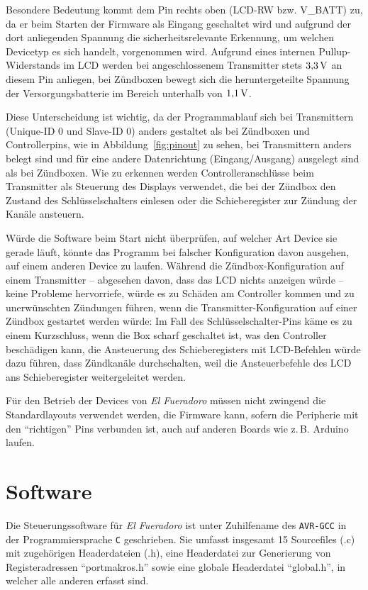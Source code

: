 \documentclass[pdftex, parskip, numbers=noenddot, toc=listof]{scrbook}
\newcommand{\anlage}{\emph{El Fueradoro}}
\begin{document}
	Besondere Bedeutung kommt dem Pin rechts oben (LCD-RW bzw. V\_BATT) zu, da er beim Starten der Firmware als Eingang geschaltet wird und aufgrund der dort anliegenden Spannung die sicherheitsrelevante Erkennung, um welchen Devicetyp es sich handelt, vorgenommen wird. Aufgrund eines internen Pullup-Widerstands im LCD werden bei angeschlossenem Transmitter stets $\unit[3{,}3]{V}$ an diesem Pin anliegen, bei Zündboxen bewegt sich die heruntergeteilte Spannung der Versorgungsbatterie im Bereich unterhalb von $\unit[1{,}1]{V}$.

	Diese Unterscheidung ist wichtig, da der Programmablauf sich bei Transmittern (Unique-ID 0 und Slave-ID 0) anders gestaltet als bei Zündboxen und Controllerpins, wie in Abbildung~\ref{fig:pinout} zu sehen, bei Transmittern anders belegt sind und für eine andere Datenrichtung (Eingang/Ausgang) ausgelegt sind als bei Zündboxen.  Wie zu erkennen werden Controlleranschlüsse beim Transmitter als Steuerung des Displays verwendet, die bei der Zündbox den Zustand des Schlüsselschalters einlesen oder die Schieberegister zur Zündung der Kanäle ansteuern.

	Würde die Software beim Start nicht überprüfen, auf welcher Art Device sie gerade läuft, könnte das Programm bei falscher Konfiguration davon ausgehen, auf einem anderen Device zu laufen. Während die Zündbox-Konfiguration auf einem Transmitter -- abgesehen davon, dass das LCD nichts anzeigen würde -- keine Probleme hervorriefe, würde es zu Schäden am Controller kommen und zu unerwünschten Zündungen führen, wenn die Transmitter-Konfiguration auf einer Zündbox gestartet werden würde: Im Fall des Schlüsselschalter-Pins käme es  zu einem Kurzschluss, wenn die Box scharf geschaltet ist, was den Controller beschädigen kann, die Ansteuerung des Schieberegisters mit LCD-Befehlen würde dazu führen, dass Zündkanäle durchschalten, weil die Ansteuerbefehle des LCD ans Schieberegister weitergeleitet werden.

	Für den Betrieb der Devices von {\anlage} müssen nicht zwingend die Standardlayouts verwendet werden, die Firmware kann, sofern die Peripherie mit den \enquote{richtigen} Pins verbunden ist, auch auf anderen Boards wie z.\,B. Arduino laufen.

	\chapter{Software}

	Die Steuerungssoftware für {\anlage} ist unter Zuhilfename des \texttt{AVR-GCC} in der Programmiersprache \texttt{C} geschrieben. Sie umfasst insgesamt 15 Sourcefiles (.c) mit zugehörigen Headerdateien (.h), eine Headerdatei zur Generierung von Registeradressen \enquote{portmakros.h} sowie eine globale Headerdatei \enquote{global.h}, in welcher alle anderen erfasst sind.
\end{document}
